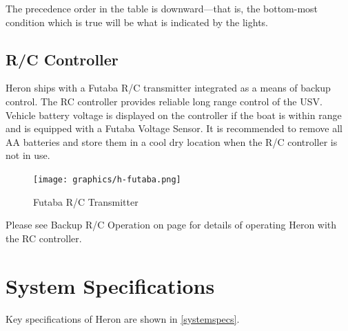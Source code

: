 \documentclass[]{clearpath-latex/clearpath-manual}
\begin{document}
The precedence order in the table is downward—that is, the bottom-most condition which is true will be what is indicated by the lights.

\newpage
\subsection{R/C Controller}
Heron ships with a Futaba R/C transmitter integrated as a means of backup control. The RC controller provides reliable long range control of the USV. Vehicle battery voltage is displayed on the controller if the boat is within range and is equipped with a Futaba Voltage Sensor.  It is recommended to remove all AA batteries and store them in a cool dry location when the R/C controller is not in use.

\begin{figure}[t]
  \centering
  \texttt{[image: graphics/h-futaba.png]}
  \caption{Futaba R/C Transmitter}
  \label{h_futaba}
\end{figure}

Please see Backup R/C Operation on page \pageref{backupoperation} for details of operating Heron with the RC controller.

\newpage


\section{System Specifications}
Key specifications of Heron are shown in \autoref{systemspecs}.
\end{document}
